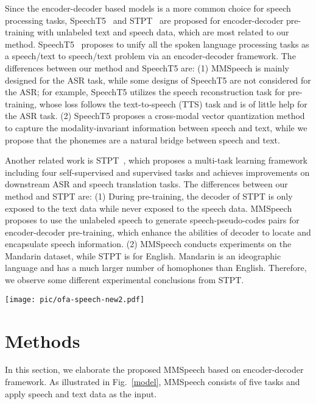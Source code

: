 \documentclass{article}
\begin{document}
Since the encoder-decoder based models is a more common choice for speech processing tasks, SpeechT5~\cite{ao2021speecht5} and STPT~\cite{tang2022unified} are proposed for encoder-decoder pre-training with unlabeled text and speech data, which are most related to our method. SpeechT5~\cite{ao2021speecht5} proposes to unify all the spoken language processing tasks as a speech/text to speech/text problem via an encoder-decoder framework. The differences between our method and SpeechT5 are: (1) MMSpeech is mainly designed for the ASR task, while some designs of SpeechT5 are not considered for the ASR; for example, SpeechT5 utilizes the speech reconstruction task for pre-training, whose loss follows the text-to-speech (TTS) task and is of little help for the ASR task. (2) SpeechT5 proposes a cross-modal vector quantization method to capture the modality-invariant information between speech and text, while we propose that the phonemes are a natural bridge between speech and text. 

Another related work is STPT~\cite{tang2022unified}, which proposes a multi-task learning framework including four self-supervised and supervised tasks and achieves improvements on downstream ASR and speech translation tasks. The differences between our method and STPT are: (1) During pre-training, the decoder of STPT is only exposed to the text data while never exposed to the speech data. MMSpeech proposes to use the unlabeled speech to generate speech-pseudo-codes pairs for encoder-decoder pre-training, which enhance the abilities of decoder to locate and encapsulate speech information. (2) MMSpeech conducts experiments on the Mandarin dataset, while STPT is for English. Mandarin is an ideographic language and has a much larger number of homophones than English. Therefore, we observe some different experimental conclusions from STPT.

 \begin{figure*}
\centering
\texttt{[image: pic/ofa-speech-new2.pdf]}
\caption{MMSpeech. The modules S2T are used in the final ASR model and the others are used to auxillate the pre-training. The blue, red lines represent speech and text  data flow in the model.}
\label{model}
\end{figure*}

\section{Methods}
In this section, we elaborate the proposed MMSpeech based on encoder-decoder framework. As illustrated in Fig.~\ref{model}, MMSpeech consists of five tasks and apply speech and text data as the input. 
\end{document}
